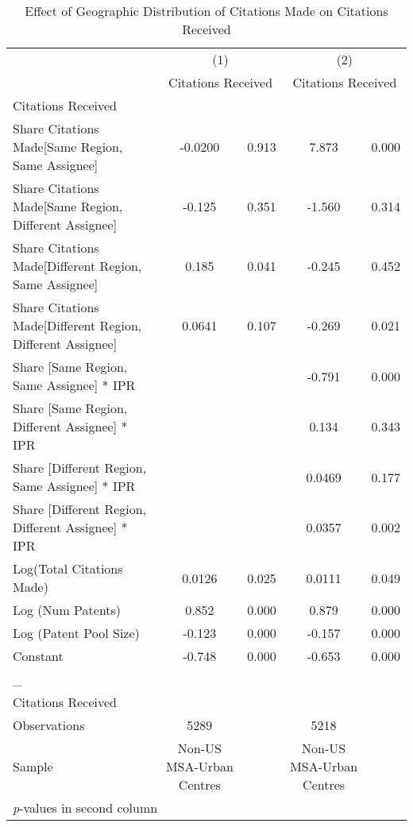 {
\begin{longtable}{l*{2}{cc}}
\caption{Effect of Geographic Distribution of Citations Made on Citations Received \label{model24}}\\
\hline\hline\endfirsthead\hline\endhead\hline\endfoot\endlastfoot
                &\multicolumn{2}{c}{(1)}&\multicolumn{2}{c}{(2)}\\
                &\multicolumn{2}{c}{Citations Received}&\multicolumn{2}{c}{Citations Received}\\
\hline
Citations Received&         &         &         &         \\
Share Citations Made[Same Region, Same Assignee]&  -0.0200&    0.913&    7.873&    0.000\\
Share Citations Made[Same Region, Different Assignee]&   -0.125&    0.351&   -1.560&    0.314\\
Share Citations Made[Different Region, Same Assignee]&    0.185&    0.041&   -0.245&    0.452\\
Share Citations Made[Different Region, Different Assignee]&   0.0641&    0.107&   -0.269&    0.021\\
Share [Same Region, Same Assignee] * IPR&         &         &   -0.791&    0.000\\
Share [Same Region, Different Assignee] * IPR&         &         &    0.134&    0.343\\
Share [Different Region, Same Assignee] * IPR&         &         &   0.0469&    0.177\\
Share [Different Region, Different Assignee] * IPR&         &         &   0.0357&    0.002\\
Log(Total Citations Made)&   0.0126&    0.025&   0.0111&    0.049\\
Log (Num Patents)&    0.852&    0.000&    0.879&    0.000\\
Log (Patent Pool Size)&   -0.123&    0.000&   -0.157&    0.000\\
Constant        &   -0.748&    0.000&   -0.653&    0.000\\
\hline
\_               &         &         &         &         \\
Citations Received&         &         &         &         \\
\hline
Observations    &     5289&         &     5218&         \\
Sample          &Non-US MSA-Urban Centres&         &Non-US MSA-Urban Centres&         \\
\hline\hline
\multicolumn{5}{l}{\footnotesize \textit{p}-values in second column}\\
\end{longtable}
}

